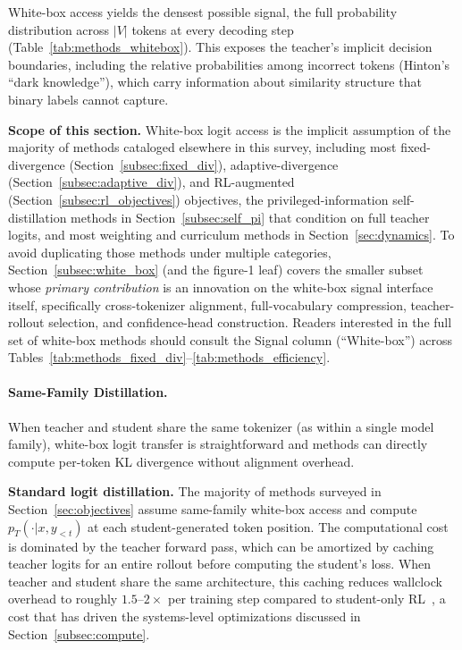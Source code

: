 \documentclass{article} %
\newcommand{\pteacher}{p_T}
\begin{document}
White-box access yields the densest possible signal, the full probability distribution across $|V|$ tokens at every decoding step (Table~\ref{tab:methods_whitebox}). This exposes the teacher's implicit decision boundaries, including the relative probabilities among incorrect tokens (Hinton's ``dark knowledge''), which carry information about similarity structure that binary labels cannot capture.

\textbf{Scope of this section.} White-box logit access is the implicit assumption of the majority of methods cataloged elsewhere in this survey, including most fixed-divergence (Section~\ref{subsec:fixed_div}), adaptive-divergence (Section~\ref{subsec:adaptive_div}), and RL-augmented (Section~\ref{subsec:rl_objectives}) objectives, the privileged-information self-distillation methods in Section~\ref{subsec:self_pi} that condition on full teacher logits, and most weighting and curriculum methods in Section~\ref{sec:dynamics}. To avoid duplicating those methods under multiple categories, Section~\ref{subsec:white_box} (and the figure-1 leaf) covers the smaller subset whose \emph{primary contribution} is an innovation on the white-box signal interface itself, specifically cross-tokenizer alignment, full-vocabulary compression, teacher-rollout selection, and confidence-head construction. Readers interested in the full set of white-box methods should consult the Signal column (``White-box'') across Tables~\ref{tab:methods_fixed_div}--\ref{tab:methods_efficiency}.

\paragraph{Same-Family Distillation.}
\label{subsubsec:same_family}

When teacher and student share the same tokenizer (as within a single model family), white-box logit transfer is straightforward and methods can directly compute per-token KL divergence without alignment overhead.

\textbf{Standard logit distillation.} The majority of methods surveyed in Section~\ref{sec:objectives} assume same-family white-box access and compute $\pteacher(\cdot|x, y_{<t})$ at each student-generated token position. The computational cost is dominated by the teacher forward pass, which can be amortized by caching teacher logits for an entire rollout before computing the student's loss. When teacher and student share the same architecture, this caching reduces wallclock overhead to roughly $1.5$--$2\times$ per training step compared to student-only RL~\citep{2306.13649}, a cost that has driven the systems-level optimizations discussed in Section~\ref{subsec:compute}.
\end{document}
